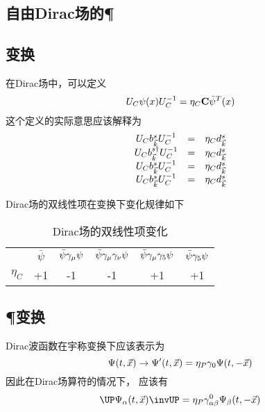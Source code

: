 \subsection{自由Dirac场的\C \P \T}
\subsection{\C 变换}
在Dirac场中，可以定义
\begin{equation}
    U_{C} \psi(x) U_{C}^{-1} = \eta_C \textbf{C} \bar \psi^T(x)
\end{equation}
这个定义的实际意思应该解释为
\begin{equation}
    \begin{array}{ccc}
        U_{C} b_{\vec k}^sU_{C}^{-1} &=& \eta_C d_{\vec k}^s \\
        U_{C} b_{\vec k}^{s\dagger}U_{C}^{-1} &=& \eta_C d_{\vec k}^s \\
        U_{C} b_{\vec k}^sU_{C}^{-1} &=& \eta_C d_{\vec k}^s \\
        U_{C} b_{\vec k}^sU_{C}^{-1} &=& \eta_C d_{\vec k}^s \\
    \end{array}
\end{equation}

Dirac场的双线性项在\C 变换下变化规律如下
\begin{table}[h]
    \caption{Dirac场的双线性项变化}
    \centering
    \begin{tabular}{cccccc}
        & $\bar \psi$ & $\bar \psi \gamma_{\mu} \psi$ & $\bar \psi \gamma_{\mu} \gamma_{\nu} \psi$ &
        $\bar \psi \gamma_{\mu} \gamma_{5} \psi$ & $\bar \psi \gamma_{5} \psi$ \\
        $\eta_C$ & +1 & -1 & -1 & +1 & +1
    \end{tabular}
\end{table}

\subsection{\P 变换}
Dirac波函数在宇称变换下应该表示为
\begin{equation}
    \Psi(t, \vec x) \rightarrow \Psi^\prime(t, \vec x) = \eta_P \gamma_{0} \Psi(t, -\vec x)
\end{equation}
因此在Dirac场算符的情况下，
应该有
\begin{equation}
    \UP \Psi_\alpha(t, \vec x) \invUP = \eta_P \diracgamma{0}_{\alpha\beta} \Psi_\beta(t, -\vec x)
\end{equation}

